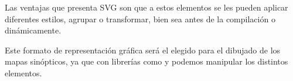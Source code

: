 Las ventajas que presenta SVG son que a estos elementos se les pueden aplicar diferentes estilos, agrupar o transformar, bien sea antes de la compilación o dinámicamente. 


Este formato de representación gráfica será el elegido para el dibujado de los mapas sinópticos, ya que con librerías como  y  podemos manipular los distintos elementos.


